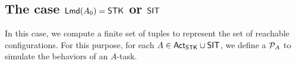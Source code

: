 

\subsection{The case ${\sf Lmd}(A_0) = \mathsf{STK}$ or $\mathsf{SIT}$}\label{sec:amass-stk}

In this case, we compute a finite set of {\WOTrNFA} tuples to represent the set of reachable configurations.
For this purpose, for each $A \in {\sf Act}_{\sf STK} \cup {\sf SIT}$, we define a {\WOTrPDS} ${\mathcal{P} }_A$ to simulate the behaviors of an $A$-task. 


